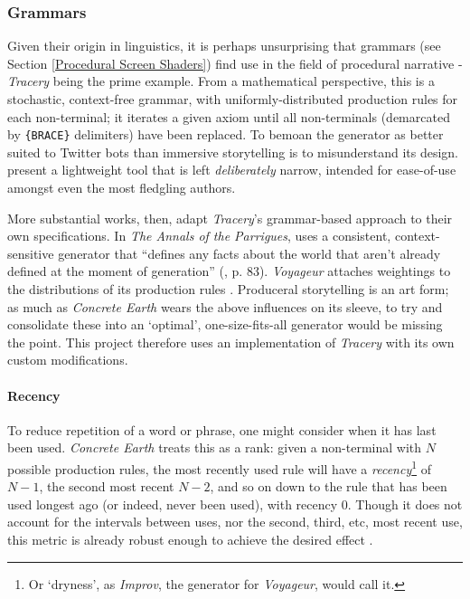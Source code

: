 \documentclass[a4paper, 11pt]{article}
\begin{document}
\begin{flushleft}
\subsubsection{Grammars}

Given their origin in linguistics, it is perhaps unsurprising that grammars (see Section \ref{Procedural Screen Shaders}) find use in the field of procedural narrative - \textit{Tracery} \citep{comptonTracery} being the prime example. From a mathematical perspective, this is a stochastic, context-free grammar, with uniformly-distributed production rules for each non-terminal; it iterates a given axiom until all non-terminals (demarcated by \texttt{\{BRACE\}} delimiters) have been replaced. To bemoan the generator as better suited to Twitter bots than immersive storytelling is to misunderstand its design. \citeauthor{comptonTracery} present a lightweight tool that is left \textit{deliberately} narrow, intended for ease-of-use amongst even the most fledgling authors.

\vspace{5pt}\noindent
More substantial works, then, adapt \textit{Tracery}'s grammar-based approach to their own specifications. In \textit{The Annals of the Parrigues}, \citeauthor{shortParrigues} uses a consistent, context-sensitive generator that ``defines any facts about the world that aren’t already defined at the moment of generation'' (\citeyear{shortParrigues}, p. 83). \textit{Voyageur} \citep{diasVoyageur} attaches weightings to the distributions of its production rules \citep{diasVoyageurDescriptions}. Produceral storytelling is an art form; as much as \textit{Concrete Earth} wears the above influences on its sleeve, to try and consolidate these into an `optimal', one-size-fits-all generator would be missing the point. This project therefore uses an implementation of \textit{Tracery} with its own custom modifications.

\paragraph{Recency} To reduce repetition of a word or phrase, one might consider when it has last been used. \textit{Concrete Earth} treats this as a rank: given a non-terminal with $N$ possible production rules, the most recently used rule will have a \textit{recency}\footnote{Or `dryness', as \textit{Improv}, the generator for \textit{Voyageur}, would call it.} of $N-1$, the second most recent $N-2$, and so on down to the rule that has been used longest ago (or indeed, never been used), with recency $0$. Though it does not account for the intervals between uses, nor the second, third, etc, most recent use, this metric is already robust enough to achieve the desired effect \citep{kazemiSimpleProceduralGeneration}.


\end{flushleft}
\end{document}
